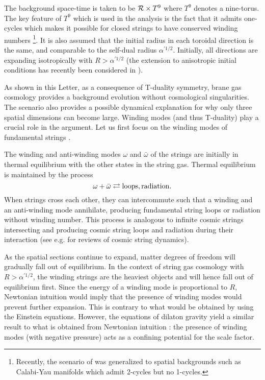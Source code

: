 \documentclass[a4paper,twocolumn,nofootinbib,tightenlines,prd,aps,
               superscriptaddress]{revtex4} %
\newcommand{\al}{\alpha}
\newcommand{\om}{\omega}
\begin{document}
The background space-time is taken to be ${\cal{R}} \times T^9$
where $T^9$ denotes a nine-torus. The key feature of $T^9$ which
is used in the analysis is the fact that it admits one-cycles
which makes it possible for closed strings to have conserved
winding numbers \footnote{Recently, the scenario of
\cite{Brandenberger:1989aj,Alexander:2000xv} was generalized
\cite{Easson:2001fy,Easther:2002mi} to spatial backgrounds such as
Calabi-Yau manifolds which admit 2-cycles but no 1-cycles.}. It is
also assumed that the initial radius in each toroidal direction is
the same, and comparable to the self-dual radius $\al^{'1/2}$.
Initially, all directions are expanding isotropically with $R >
\al^{'1/2}$ (the extension to anisotropic initial conditions has
recently been considered in \cite{Watson:2002nx}).

As shown in this Letter, as a consequence of T-duality symmetry,
brane gas cosmology provides a background evolution without
cosmological singularities. The scenario also provides a possible
dynamical explanation for why only three spatial dimensions can
become large. Winding modes (and thus T-duality) play a crucial
role in the argument. Let us first focus on the winding modes of
fundamental strings \cite{Brandenberger:1989aj}.

The winding and anti-winding modes $\om$ and $\bar{\om}$
of the strings are initially in thermal
equilibrium with the other states in the string gas. Thermal
equilibrium is maintained by the process
\begin{equation} \label{eq:equilibrium}
    \om + \bar{\om} \rightleftarrows \rm{loops, radiation}.
\end{equation}
When strings cross each other, they can intercommute such that a
winding and an anti-winding mode annihilate, producing fundamental
string loops or radiation without winding number. This process is
analogous to infinite cosmic strings intersecting and producing
cosmic string loops and radiation during their interaction (see
e.g. \cite{VilenkinShellard,Brandenberger:1994by} for reviews of
cosmic string dynamics).

As the spatial sections continue to expand, matter degrees of
freedom will gradually fall out of equilibrium. In the context of
string gas cosmology with $R > \al^{'1/2}$, the winding strings
are the heaviest objects and will hence fall out of equilibrium
first. Since the energy of a winding mode is proportional to $R$,
Newtonian intuition would imply that the presence of winding modes
would prevent further expansion. This is contrary to what would be
obtained by using the Einstein equations. However, the equations
of dilaton gravity yield a similar result to what is obtained from
Newtonian intuition \cite{Tseytlin:1992xk}: the presence of
winding modes (with negative pressure) acts as a confining
potential for the scale factor.
\end{document}
